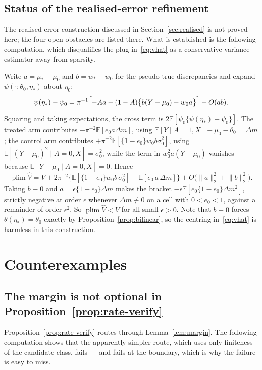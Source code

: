 \documentclass[11pt]{article}
\theoremstyle{plain}
\theoremstyle{definition}
\theoremstyle{remark}
\newcommand{\E}{\mathbb{E}}
\newcommand{\ez}{e_0}
\newcommand{\mz}{\mu_0}
\newcommand{\wz}{w_0}
\newcommand{\Vhat}{\widehat{V}}
\newcommand{\Ltwo}[1]{\lVert #1 \rVert_{2}}
\DeclareMathOperator{\plim}{plim}
\begin{document}
\subsection*{Status of the realised-error refinement}

The realised-error construction discussed in Section~\ref{sec:realised} is not
proved here; the four open obstacles are listed there. What is established is the
following computation, which disqualifies the plug-in~\eqref{eq:vhat} as a
conservative variance estimator away from sparsity.

Write $a=\mu_*-\mz$ and $b=w_*-\wz$ for the pseudo-true discrepancies and expand
$\psi(\cdot;\theta_0,\eta_*)$ about $\eta_0$:
\[
  \psi(\eta_*)-\psi_0
  =\pi^{-1}\Bigl[-Aa-(1-A)\bigl\{b(Y-\mz)-\wz a\bigr\}\Bigr]+O(ab).
\]
Squaring and taking expectations, the cross term is $2\E[\psi_0\{\psi(\eta_*)-\psi_0\}]$.
The treated arm contributes $-\pi^{-2}\E[\ez a\Delta m]$, using
$\E[Y\mid A=1,X]-\mz-\theta_0=\Delta m$; the control arm contributes
$+\pi^{-2}\E[\{1-\ez\}\wz b\sigma_0^2]$, using
$\E[(Y-\mz)^2\mid A=0,X]=\sigma_0^2$, while the term in $\wz^2a(Y-\mz)$ vanishes
because $\E[Y-\mz\mid A=0,X]=0$. Hence
\[
  \plim\Vhat=V+2\pi^{-2}\bigl\{\E[\{1-\ez\}\wz b\,\sigma_0^2]
   -\E[\ez\,a\,\Delta m]\bigr\}+O\bigl(\Ltwo a^2+\Ltwo b^2\bigr).
\]
Taking $b\equiv0$ and $a=\epsilon\{1-\ez\}\Delta m$ makes the bracket
$-\epsilon\E[\ez\{1-\ez\}\Delta m^2]$, strictly negative at order $\epsilon$
whenever $\Delta m\not\equiv0$ on a cell with $0<\ez<1$, against a remainder of
order $\epsilon^2$. So $\plim\Vhat<V$ for all small $\epsilon>0$. Note that
$b\equiv0$ forces $\theta(\eta_*)=\theta_0$ exactly by
Proposition~\ref{prop:bilinear}, so the centring in~\eqref{eq:vhat} is harmless in
this construction.

\section{Counterexamples}\label{app:counterex}

\subsection*{The margin is not optional in Proposition~\ref{prop:rate-verify}}

Proposition~\ref{prop:rate-verify} routes through Lemma~\ref{lem:margin}. The
following computation shows that the apparently simpler route, which uses only
finiteness of the candidate class, fails --- and fails at the boundary, which is
why the failure is easy to miss.
\end{document}
